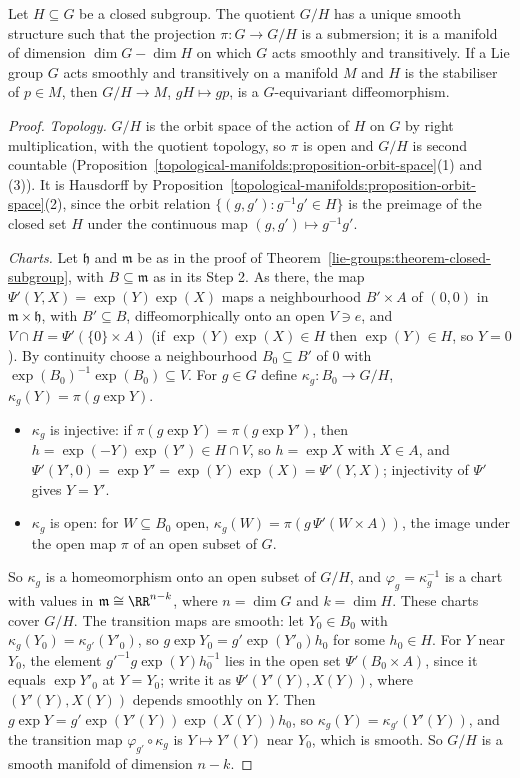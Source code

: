 \begin{theorem}\label{lie-groups:theorem-homogeneous}
Let $H \subseteq G$ be a closed subgroup. The quotient $G/H$ has a unique smooth structure such that the projection $\pi \colon G \to G/H$ is a submersion; it is a manifold of dimension $\dim G - \dim H$ on
which $G$ acts smoothly and transitively. If a Lie group $G$ acts smoothly and transitively on a manifold $M$ and $H$ is the stabiliser of $p \in M$, then $G/H \to M$, $gH \mapsto gp$, is a
$G$-equivariant diffeomorphism.
\end{theorem}

\begin{proof}
\emph{Topology.} $G/H$ is the orbit space of the action of $H$ on $G$ by right multiplication, with the quotient topology, so $\pi$ is open and $G/H$ is second
countable (Proposition~\ref{topological-manifolds:proposition-orbit-space}(1) and (3)). It is Hausdorff by
Proposition~\ref{topological-manifolds:proposition-orbit-space}(2), since the orbit relation $\{(g, g') : g^{-1}g' \in H\}$ is the preimage of the closed set $H$
under the continuous map $(g, g') \mapsto g^{-1}g'$.

\emph{Charts.} Let $\mathfrak{h}$ and $\mathfrak{m}$ be as in the proof of Theorem~\ref{lie-groups:theorem-closed-subgroup}, with $B \subseteq \mathfrak{m}$
as in its Step 2. As there, the map $\Psi'(Y, X) = \exp(Y)\exp(X)$ maps a neighbourhood $B' \times A$ of $(0, 0)$ in $\mathfrak{m} \times \mathfrak{h}$,
with $B' \subseteq B$, diffeomorphically onto an open $V \ni e$, and $V \cap H = \Psi'(\{0\} \times A)$ (if $\exp(Y)\exp(X) \in H$ then $\exp(Y) \in H$, so
$Y = 0$). By continuity choose a neighbourhood $B_0 \subseteq B'$ of $0$ with $\exp(B_0)^{-1}\exp(B_0) \subseteq V$. For $g \in G$ define
$\kappa_g \colon B_0 \to G/H$, $\kappa_g(Y) = \pi(g\exp Y)$.
\begin{itemize}
\item $\kappa_g$ is injective: if $\pi(g\exp Y) = \pi(g\exp Y')$, then $h = \exp(-Y)\exp(Y') \in H \cap V$, so $h = \exp X$ with $X \in A$, and
$\Psi'(Y', 0) = \exp Y' = \exp(Y)\exp(X) = \Psi'(Y, X)$; injectivity of $\Psi'$ gives $Y = Y'$.
\item $\kappa_g$ is open: for $W \subseteq B_0$ open, $\kappa_g(W) = \pi(g\,\Psi'(W \times A))$, the image under the open map $\pi$ of an open subset of $G$.
\end{itemize}
So $\kappa_g$ is a homeomorphism onto an open subset of $G/H$, and $\varphi_g = \kappa_g^{-1}$ is a chart with values in $\mathfrak{m} \cong \RR^{n-k}$, where
$n = \dim G$ and $k = \dim H$. These charts cover $G/H$. The transition maps are smooth: let $Y_0 \in B_0$ with $\kappa_g(Y_0) = \kappa_{g'}(Y'_0)$, so
$g\exp Y_0 = g'\exp(Y'_0)h_0$ for some $h_0 \in H$. For $Y$ near $Y_0$, the element $g'^{-1}g\exp(Y)h_0^{-1}$ lies in the open set $\Psi'(B_0 \times A)$, since it
equals $\exp Y'_0$ at $Y = Y_0$; write it as $\Psi'(Y'(Y), X(Y))$, where $(Y'(Y), X(Y))$ depends smoothly on $Y$. Then
$g\exp Y = g'\exp(Y'(Y))\exp(X(Y))h_0$, so $\kappa_g(Y) = \kappa_{g'}(Y'(Y))$, and the transition map $\varphi_{g'} \circ \kappa_g$ is $Y \mapsto Y'(Y)$ near $Y_0$,
which is smooth. So $G/H$ is a smooth manifold of dimension $n - k$.


\end{proof}
